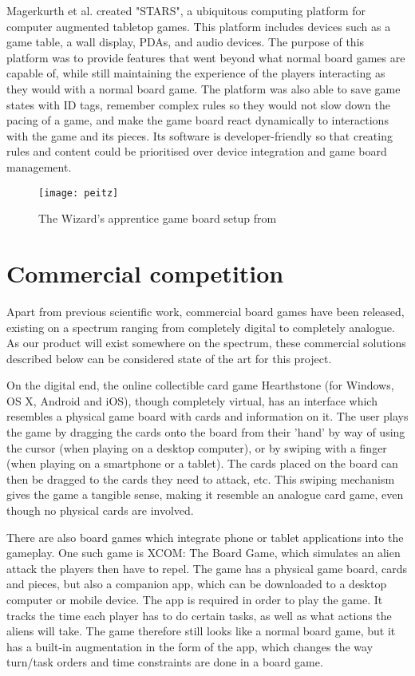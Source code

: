 Magerkurth et al. \citep{magStars} created "STARS", a ubiquitous computing platform for computer augmented tabletop games. This platform includes devices such as a game table, a wall display, PDAs, and audio devices. The purpose of this platform was to provide features that went beyond what normal board games are capable of, while still maintaining the experience of the players interacting as they would with a normal board game. The platform was also able to save game states with ID tags, remember complex rules so they would not slow down the pacing of a game, and make the game board react dynamically to interactions with the game and its pieces. Its software is developer-friendly so that creating rules and content could be prioritised over device integration and game board management. 

\begin{figure}[!h]
\centering	
\texttt{[image: peitz]}
\caption{The Wizard's apprentice game board setup from \citep{peitzWizards2006}}
\label{fig:peitz}
\end{figure}

\section{Commercial competition}
Apart from previous scientific work, commercial board games have been released, existing on a spectrum ranging from completely digital to completely analogue. As our product will exist somewhere on the spectrum, these commercial solutions described below can be considered state of the art for this project.

On the digital end, the online collectible card game Hearthstone (for Windows, OS X, Android and iOS), though completely virtual, has an interface which resembles a physical game board with cards and information on it. The user plays the game by dragging the cards onto the board from their 'hand' by way of using the cursor (when playing on a desktop computer), or by swiping with a finger (when playing on a smartphone or a tablet). The cards placed on the board can then be dragged to the cards they need to attack, etc. This swiping mechanism gives the game a tangible sense, making it resemble an analogue card game, even though no physical cards are involved.

There are also board games which integrate phone or tablet applications into the gameplay. One such game is XCOM: The Board Game, which simulates an alien attack the players then have to repel. The game has a physical game board, cards and pieces, but also a companion app, which can be downloaded to a desktop computer or mobile device. The app is required in order to play the game. It tracks the time each player has to do certain tasks, as well as what actions the aliens will take. The game therefore still looks like a normal board game, but it has a built-in augmentation in the form of the app, which changes the way turn/task orders and time constraints are done in a board game.

